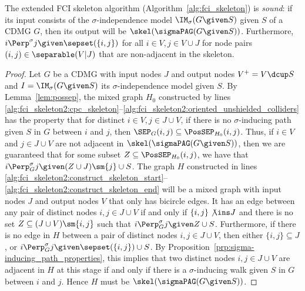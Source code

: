 \begin{Thm}\label{thm:fci_skeleton_sound}
  The extended FCI skeleton algorithm (Algorithm~\ref{alg:fci_skeleton}) is \emph{sound}: if its input consists of the $\sigma$-independence model $\IM_\sigma(G \given S)$ given $S$ of a CDMG $G$, then its output will be $\skel(\sigmaPAG(G \given S))$. Furthermore, $i \Perp^\sigma j \given \sepset(\{i,j\})$ for all $i \in V, j \in V \cup J$ for node pairs $(i,j) \in \separable(V|J)$ that are non-adjacent in the skeleton.
\end{Thm}
\begin{proof}
  Let $G$ be a CDMG with input nodes $J$ and output nodes $V^+ = V \dcup S$ and $I = \IM_\sigma(G \given S)$ its $\sigma$-independence model given $S$.
  By Lemma~\ref{lem:possep}, the mixed graph $H_0$ constructed by lines 
  \ref{alg:fci_skeleton2:cpc_skeleton}--\ref{alg:fci_skeleton2:oriented_unshielded_colliders}
  has the property that for distinct $i \in V, j \in J \cup V$, if there is no $\sigma$-inducing path given $S$ in $G$ between $i$ and $j$, then $\SEP_G(i,j) \subseteq \PosSEP_{H_0}(i,j)$.
  Thus, if $i \in V$ and $j \in J \cup V$ are not adjacent in $\skel(\sigmaPAG(G \given S))$, then we are guaranteed that for some subset $Z \subseteq \PosSEP_{H_0}(i,j)$, we have that $i \Perp^\sigma_G j \given (Z \cup J) \sm \{j\} \cup S$.
  The graph $H$ constructed in lines \ref{alg:fci_skeleton2:construct_skeleton_start}--\ref{alg:fci_skeleton2:construct_skeleton_end} will be a mixed graph with input nodes $J$ and output nodes $V$ that only has bicircle edges.
  It has an edge between any pair of distinct nodes $i,j \in J\cup V$ if and only if $\{i,j\} \not\ins J$ and there is no set $Z \subseteq (J \cup V) \sm \{i,j\}$ such that $i \Perp^\sigma_G j \given Z \cup S$.
  Furthermore, if there is no edge in $H$ between a pair of distinct nodes $i,j \in J \cup V$, then either $\{i,j\} \subseteq J$, or $i \Perp^\sigma_G j \given \sepset(\{i,j\}) \cup S$.
  By Proposition~\ref{prp:sigma-inducing_path_properties}, this implies that two distinct nodes $i,j \in J \cup V$ are adjacent in $H$ at this stage if and only if there is a $\sigma$-inducing walk given $S$ in $G$ between $i$ and $j$.
  Hence $H$ must be $\skel(\sigmaPAG(G \given S))$.
\end{proof}


